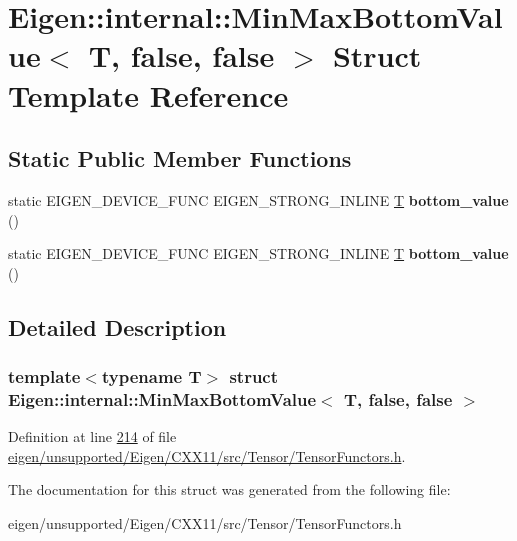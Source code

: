 \hypertarget{struct_eigen_1_1internal_1_1_min_max_bottom_value_3_01_t_00_01false_00_01false_01_4}{}\section{Eigen\+:\+:internal\+:\+:Min\+Max\+Bottom\+Value$<$ T, false, false $>$ Struct Template Reference}
\label{struct_eigen_1_1internal_1_1_min_max_bottom_value_3_01_t_00_01false_00_01false_01_4}
\subsection*{Static Public Member Functions}
\begin{DoxyCompactItemize}
\item 
\mbox{\label{struct_eigen_1_1internal_1_1_min_max_bottom_value_3_01_t_00_01false_00_01false_01_4_a2e6192527e6eb5862127bf0700888f4f}} 
static E\+I\+G\+E\+N\+\_\+\+D\+E\+V\+I\+C\+E\+\_\+\+F\+U\+NC E\+I\+G\+E\+N\+\_\+\+S\+T\+R\+O\+N\+G\+\_\+\+I\+N\+L\+I\+NE \hyperlink{group___sparse_core___module}{T} {\bfseries bottom\+\_\+value} ()
\item 
\mbox{\label{struct_eigen_1_1internal_1_1_min_max_bottom_value_3_01_t_00_01false_00_01false_01_4_a2e6192527e6eb5862127bf0700888f4f}} 
static E\+I\+G\+E\+N\+\_\+\+D\+E\+V\+I\+C\+E\+\_\+\+F\+U\+NC E\+I\+G\+E\+N\+\_\+\+S\+T\+R\+O\+N\+G\+\_\+\+I\+N\+L\+I\+NE \hyperlink{group___sparse_core___module}{T} {\bfseries bottom\+\_\+value} ()
\end{DoxyCompactItemize}


\subsection{Detailed Description}
\subsubsection*{template$<$typename T$>$\newline
struct Eigen\+::internal\+::\+Min\+Max\+Bottom\+Value$<$ T, false, false $>$}



Definition at line \hyperlink{eigen_2unsupported_2_eigen_2_c_x_x11_2src_2_tensor_2_tensor_functors_8h_source_l00214}{214} of file \hyperlink{eigen_2unsupported_2_eigen_2_c_x_x11_2src_2_tensor_2_tensor_functors_8h_source}{eigen/unsupported/\+Eigen/\+C\+X\+X11/src/\+Tensor/\+Tensor\+Functors.\+h}.



The documentation for this struct was generated from the following file\+:\begin{DoxyCompactItemize}
\item 
eigen/unsupported/\+Eigen/\+C\+X\+X11/src/\+Tensor/\+Tensor\+Functors.\+h\end{DoxyCompactItemize}
